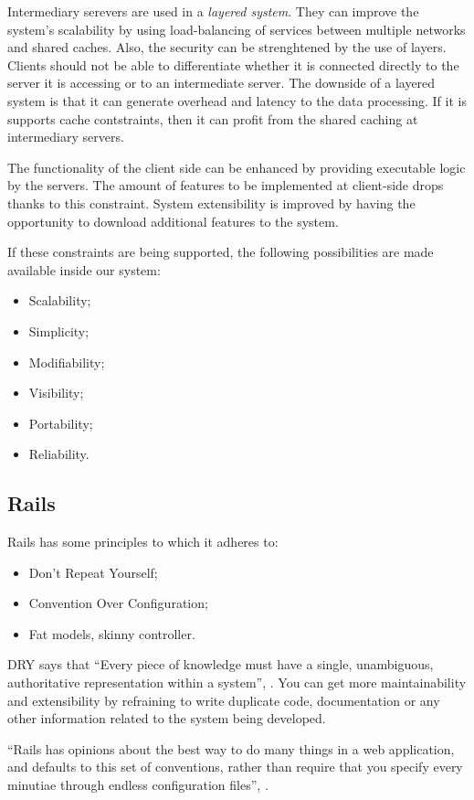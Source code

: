 Intermediary serevers are used in a \textit{layered system}. They can improve the system's scalability by using load-balancing of services between multiple networks and shared caches. Also, the security can be strenghtened by the use of layers. Clients should not be able to differentiate whether it is connected directly to the server it is accessing or to an intermediate server.
The downside of a layered system is that it can generate overhead and latency to the data processing. If it is supports cache contstraints, then it can profit from the shared caching at intermediary servers.

The functionality of the client side can be enhanced by providing executable logic by the servers. The amount of features to be implemented at client-side drops thanks to this constraint. System extensibility is improved by having the opportunity to download additional features to the system.


If these constraints are being supported, the following possibilities are made available inside our system:
\begin{itemize} 
  \item Scalability;
  \item Simplicity;
  \item Modifiability;
  \item Visibility;
  \item Portability;
  \item Reliability.
\end{itemize}


\subsection{Rails}

Rails has some principles to which it adheres to:
\begin{itemize}
  \item Don't Repeat Yourself;
  \item Convention Over Configuration;
  \item Fat models, skinny controller.
\end{itemize}

DRY says that ``Every piece of knowledge must have a single, unambiguous, authoritative representation within a system'', \cite{dry_principle}. You can get more maintainability and extensibility by refraining to write duplicate code, documentation or any other information related to the system being developed. 

``Rails has opinions about the best way to do many things in a web application, and defaults to this set of conventions, rather than require that you specify every minutiae through endless configuration files'', \cite{rails_principles}.

